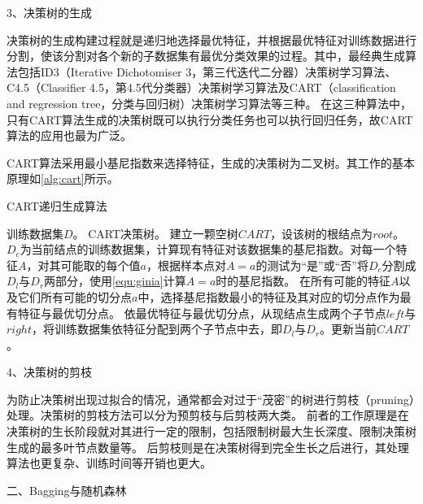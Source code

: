 3、决策树的生成

决策树的生成构建过程就是递归地选择最优特征，并根据最优特征对训练数据进行分割，使该分割对各个新的子数据集有最优分类效果的过程。其中，最经典生成算法包括ID3（Iterative Dichotomiser 3，第三代迭代二分器）决策树学习算法、
C4.5（Classifier 4.5，第4.5代分类器）决策树学习算法及CART（classification and regression tree，分类与回归树）决策树学习算法等三种\cite{quinlan1986,quinlan1993,breiman1984}。
在这三种算法中，只有CART算法生成的决策树既可以执行分类任务也可以执行回归任务，故CART算法的应用也最为广泛。

CART算法采用最小基尼指数来选择特征，生成的决策树为二叉树。其工作的基本原理如\autoref{alg:cart}所示。
\begin{breakablealgorithm}
    \caption[CART生成算法]{CART递归生成算法\cite{Li2017}}
    \label{alg:cart}
    \begin{algorithmic}[1] %
        \Require 训练数据集$D$。
        \Ensure CART决策树。
        \State 建立一颗空树$CART$，设该树的根结点为$root$。
            \State $D_c$为当前结点的训练数据集，计算现有特征对该数据集的基尼指数。对每一个特征$A$，对其可能取的每个值$a$，根据样本点对$A=a$的测试为“是”或“否”将$D_c$分割成$D_l$与$D_r$两部分，使用\autoref{equ:ginia}计算$A=a$时的基尼指数。
            \State 在所有可能的特征$A$以及它们所有可能的切分点$a$中，选择基尼指数最小的特征及其对应的切分点作为最有特征与最优切分点。
            \State 依最优特征与最优切分点，从现结点生成两个子节点$left$与$right$，将训练数据集依特征分配到两个子节点中去，即$D_l$与$D_r$。更新当前$CART$。
                \State {}
            \Else    
                \State {}
                \State {}
            \EndIf
        \EndFunction
    \end{algorithmic}
\end{breakablealgorithm}

4、决策树的剪枝

为防止决策树出现过拟合的情况，通常都会对过于“茂密”的树进行剪枝（pruning）处理。决策树的剪枝方法可以分为预剪枝与后剪枝两大类。
前者的工作原理是在决策树的生长阶段就对其进行一定的限制，包括限制树最大生长深度、限制决策树生成的最多叶节点数量等。
后剪枝则是在决策树得到完全生长之后进行，其处理算法也更复杂、训练时间等开销也更大\cite{Zhou2016,Liu2018}。

二、Bagging与随机森林

